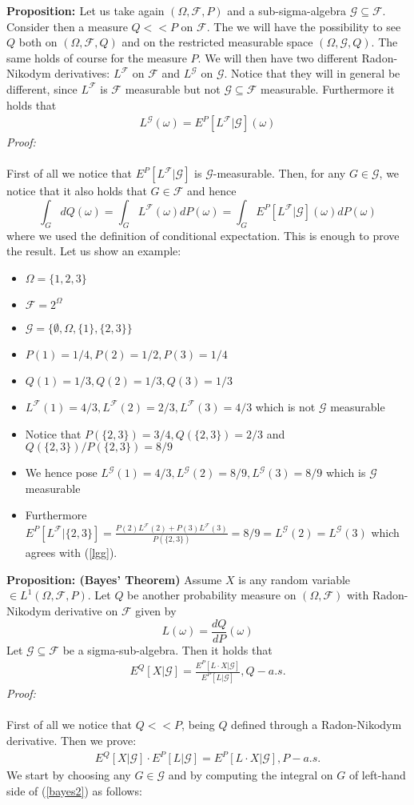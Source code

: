 \documentclass[a4paper,10pt]{report}
\theoremstyle{plain}
\theoremstyle{definition}
\newcommand\be{\begin{eqnarray}}    %
\newcommand\ee{\end{eqnarray}}
\newcommand{\PROP} {{\bf{Proposition: }}}
\newcommand{\PROOF} {{\emph{Proof: \\ \\}}}
\newcommand{\FF} {\mathcal{F} }
\newcommand{\GG} {\mathcal{G} }
\newcommand{\DPO} {dP(\omega) }
\begin{document}
\PROP Let us take again $(\Omega,\FF, P)$ and a sub-sigma-algebra $\GG\subseteq \FF$. Consider then a measure $Q<<P$ on $\FF$. The we will have the possibility to see $Q$ both on $(\Omega,\FF, Q)$ and on the restricted measurable space $(\Omega,\GG, Q)$. The same holds of course for the measure $P$.
We will then have two different Radon-Nikodym derivatives: $L^\FF$ on $\FF$ and $L^\GG$ on $\GG$. Notice that they will in general be different, since $L^\FF$ is $\FF$ measurable but not $\GG\subseteq \FF$ measurable. Furthermore it holds that
\be
L^\GG(\omega)=E^P[L^\FF|\GG](\omega)
\label{lgg}
\ee
\PROOF
First of all we notice that $E^P[L^\FF|\GG]$ is $\GG$-measurable. Then, for any $G\in \GG$, we notice that it also holds that $G\in\FF$ and hence
\[
\int_G dQ(\omega)=\int_G L^\FF(\omega)\DPO=\int_G E^P[L^\FF|\GG](\omega)\DPO
\]
where we used the definition of conditional expectation. This is enough to prove the result.
Let us show an example:
\begin{itemize}
\item $\Omega=\{1,2,3\}$
\item $\FF=2^\Omega$
\item $\GG=\{\emptyset, \Omega, \{1\}, \{2,3\}\}$
\item $P(1)=1/4, P(2)=1/2, P(3)=1/4$
\item $Q(1)=1/3, Q(2)=1/3, Q(3)=1/3$
\item $L^\FF(1)=4/3, L^\FF(2)=2/3,L^\FF(3)=4/3$ which is not $\GG$ measurable
\item Notice that $P(\{2,3\})=3/4, Q(\{2,3\})=2/3$ and  $Q(\{2,3\})/P(\{2,3\})=8/9$
\item We hence pose $L^\GG(1)=4/3, L^\GG(2)=8/9,L^\GG(3)=8/9$ which is $\GG$ measurable
\item Furthermore 	$E^P[L^\FF|\{2,3\}]=\frac{P(2)L^\FF(2)+P(3)L^\FF(3)}{P(\{2,3\})}=8/9=L^\GG(2)=L^\GG(3)$ which agrees with (\ref{lgg}).
\end{itemize}
\PROP {\bf{(Bayes' Theorem)}}
Assume $X$ is any random variable $\in L^1(\Omega, \FF, P)$. Let $Q$ be another probability measure on $(\Omega, \FF)$ with Radon-Nikodym derivative on $\FF$ given by
\[
L(\omega)=\frac{dQ}{dP}(\omega)
\]
Let $\GG\subseteq\FF$ be a sigma-sub-algebra. Then it holds that
\be
E^Q[X|\GG] =\frac{E^P[L\cdot X|\GG]}{E^P[L|\GG]}, Q-a.s.
\label{bayes}
\ee
\PROOF
First of all we notice that $Q<<P$, being $Q$ defined through a Radon-Nikodym derivative. 
Then we prove:
\be
E^Q[X|\GG]\cdot E^P[L|\GG]=E^P[L\cdot X|\GG], P-a.s.
\label{bayes2}
\ee
We start by choosing any $G\in \GG$ and by computing the integral on $G$ of left-hand side of (\ref{bayes2}) as follows:
\end{document}
